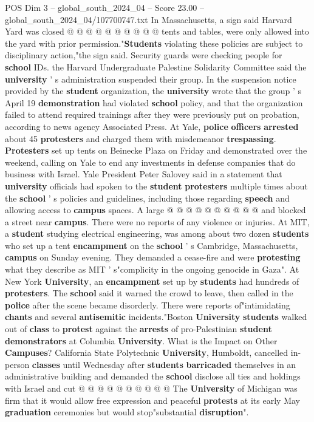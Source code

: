 \begin{textsample}{POS Dim 3 – global\_south\_2024\_04 – Score 23.00 – global\_south\_2024\_04/107700747.txt}
In Massachusetts, a sign said Harvard Yard was closed @ @ @ @ @ @ @ @ @ @ tents and tables, were only allowed into the yard with prior permission."\textbf{Students} violating these policies are subject to disciplinary action,"the sign said.
Security guards were checking people for \textbf{school} IDs. the Harvard Undergraduate Palestine Solidarity Committee said the \textbf{university} ' s administration suspended their group.
In the suspension notice provided by the \textbf{student} organization, the \textbf{university} wrote that the group ' s April 19 \textbf{demonstration} had violated \textbf{school} policy, and that the organization failed to attend required trainings after they were previously put on probation, according to news agency Associated Press.
At Yale, \textbf{police} \textbf{officers} \textbf{arrested} about 45 \textbf{protesters} and charged them with misdemeanor \textbf{trespassing}. \textbf{Protesters} set up tents on Beinecke Plaza on Friday and demonstrated over the weekend, calling on Yale to end any investments in defense companies that do business with Israel.
Yale President Peter Salovey said in a statement that \textbf{university} officials had spoken to the \textbf{student} \textbf{protesters} multiple times about the \textbf{school} ' s policies and guidelines, including those regarding \textbf{speech} and allowing access to \textbf{campus} spaces.
A large @ @ @ @ @ @ @ @ @ @ and blocked a street near \textbf{campus}.
There were no reports of any violence or injuries.
At MIT, a \textbf{student} studying electrical engineering, was among about two dozen \textbf{students} who set up a tent \textbf{encampment} on the \textbf{school} ' s Cambridge, Massachusetts, \textbf{campus} on Sunday evening.
They demanded a cease-fire and were \textbf{protesting} what they describe as MIT ' s"complicity in the ongoing genocide in Gaza".
At New York \textbf{University}, an \textbf{encampment} set up by \textbf{students} had hundreds of \textbf{protesters}.
The \textbf{school} said it warned the crowd to leave, then called in the \textbf{police} after the scene became disorderly.
There were reports of"intimidating \textbf{chants} and several \textbf{antisemitic} incidents."Boston \textbf{University} \textbf{students} walked out of \textbf{class} to \textbf{protest} against the \textbf{arrests} of pro-Palestinian \textbf{student} \textbf{demonstrators} at Columbia \textbf{University}.
What is the Impact on Other \textbf{Campuses}?
California State Polytechnic \textbf{University}, Humboldt, cancelled in-person \textbf{classes} until Wednesday after \textbf{students} \textbf{barricaded} themselves in an administrative building and demanded the \textbf{school} disclose all ties and holdings with Israel and cut @ @ @ @ @ @ @ @ @ @ The \textbf{University} of Michigan was firm that it would allow free expression and peaceful \textbf{protests} at its early May \textbf{graduation} ceremonies but would stop"substantial \textbf{disruption}".

\end{textsample}
